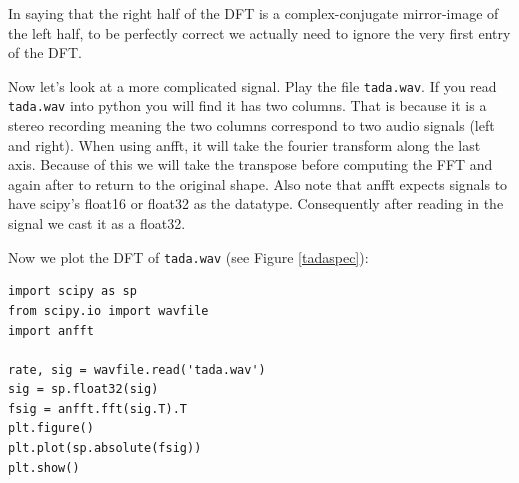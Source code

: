 In saying that the right half of the DFT is a complex-conjugate mirror-image of the left half, to be perfectly correct we actually need to ignore the very first entry of the DFT.

Now let's look at a more complicated signal. Play the file \texttt{tada.wav}.  If you read \texttt{tada.wav} into python you will find it has two columns.  That is because it is a stereo recording meaning the two columns correspond to two audio signals (left and right).  When using anfft, it will take the fourier transform along the last axis.  Because of this we will take the transpose before computing the FFT and again after to return to the original shape.  Also note that anfft expects signals to have scipy's float16 or float32 as the datatype.  Consequently after reading in the signal we cast it as a float32. 

Now we plot the DFT of \texttt{tada.wav} (see Figure \ref{tadaspec}):
\begin{lstlisting}
import scipy as sp
from scipy.io import wavfile
import anfft

rate, sig = wavfile.read('tada.wav')
sig = sp.float32(sig)
fsig = anfft.fft(sig.T).T
plt.figure()
plt.plot(sp.absolute(fsig))
plt.show()
\end{lstlisting}


